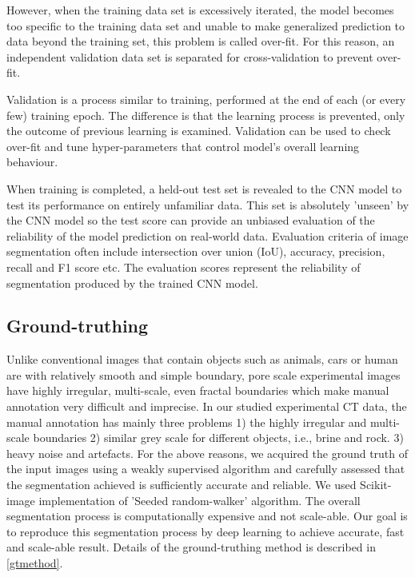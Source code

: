 \documentclass[draft,linenumbers]{agujournal2018}
\begin{document}
However, when the training data set is excessively iterated, the model becomes too specific to the training data set and unable to make generalized prediction to data beyond the training set, this problem is called over-fit. For this reason, an independent validation data set is separated for cross-validation to prevent over-fit.

Validation is a process similar to training, performed at the end of each (or every few) training epoch. The difference is that the learning process is prevented, only the outcome of previous learning is examined. Validation can be used to check over-fit and tune hyper-parameters that control model's overall learning behaviour. 

When training is completed, a held-out test set is revealed to the CNN model to test its performance on entirely unfamiliar data. This set is absolutely 'unseen' by the CNN model so the test score can provide an unbiased evaluation of the reliability of the model prediction on real-world data. Evaluation criteria of image segmentation often include intersection over union (IoU), accuracy, precision, recall and F1 score etc. The evaluation scores represent the reliability of segmentation produced by the trained CNN model.

\subsection{Ground-truthing}\label{gtintro}
Unlike conventional images that contain objects such as animals, cars or human are with relatively smooth and simple boundary, pore scale experimental images have highly irregular, multi-scale, even fractal boundaries which make manual annotation very difficult and imprecise. In our studied experimental \textmu CT data, the manual annotation has mainly three problems 1) the highly irregular and multi-scale boundaries 2) similar grey scale for different objects, i.e., brine and rock. 3) heavy noise and artefacts. For the above reasons, we acquired the ground truth of the input images using a weakly supervised algorithm and carefully assessed that the segmentation achieved is sufficiently accurate and reliable. We used Scikit-image implementation of 'Seeded random-walker' \citep{grady2006random} algorithm. The overall segmentation process is computationally expensive and not scale-able. Our goal is to reproduce this segmentation process by deep learning to achieve accurate, fast and scale-able result. Details of the ground-truthing method is described in \ref{gtmethod}.
\end{document}
